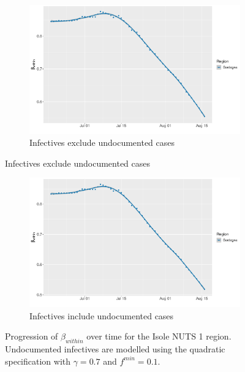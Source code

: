 \documentclass[12pt]{article}
\begin{document}
\begin{appendices}
		\begin{figure}[H]
    	    \centering
    	    \begin{subfigure}{\textwidth}
    	      \centering
    	      \includegraphics[width=0.94\linewidth]{output/model_within_lag14_betawithin_Isole_rolling.pdf}
    	      \caption{Infectives exclude undocumented cases}
    	      \label{fig:beta_within_over_time_isole_regular}
    	    \end{subfigure}
        \end{figure}
        \begin{figure}[H]\ContinuedFloat
    	    \begin{subfigure}{\textwidth}
    	      \centering
    	      \includegraphics[width=0.94\linewidth]{output/model_within_lag14_betawithin_Isole_UndocQuadratic_rolling.pdf}
    	      \caption{Infectives include undocumented cases}
    	      \label{fig:beta_within_over_time_isole_regular_undoc}
    	    \end{subfigure}
    	    \caption{Progression of $\beta_{within}$ over time for the Isole NUTS 1 region. Undocumented infectives are modelled using the quadratic specification with $\gamma = 0.7$ and $f^{min}=0.1$.}
    	    \label{fig:beta_within_over_time_isole}
	    \end{figure}
		

\end{appendices}
\end{document}
